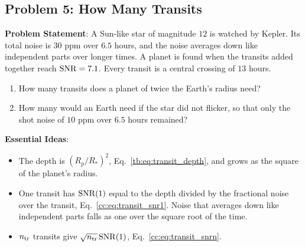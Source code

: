 \subsection{Problem 5: How Many Transits}
\label{cc:prob:transit}

\textbf{Problem Statement}: A Sun-like star of magnitude $12$ is watched by Kepler. Its total noise is $30$ ppm over $6.5$ hours, and the noise averages down like independent parts over longer times. A planet is found when the transits added together reach $\mathrm{SNR}=7.1$. Every transit is a central crossing of $13$ hours.
\begin{enumerate}[label=(\alph*)]
	\item How many transits does a planet of twice the Earth's radius need?
	\item How many would an Earth need if the star did not flicker, so that only the shot noise of $10$ ppm over $6.5$ hours remained?
\end{enumerate}

\textbf{Essential Ideas}:
\begin{itemize}
	\item The depth is $(R_p/R_*)^2$, Eq.~\eqref{tb:eq:transit_depth}, and grows as the square of the planet's radius.
	\item One transit has $\mathrm{SNR}(1)$ equal to the depth divided by the fractional noise over the transit, Eq.~\eqref{cc:eq:transit_snr1}. Noise that averages down like independent parts falls as one over the square root of the time.
	\item $n_{\rm tr}$ transits give $\sqrt{n_{\rm tr}}\,\mathrm{SNR}(1)$, Eq.~\eqref{cc:eq:transit_snrn}.
\end{itemize}

